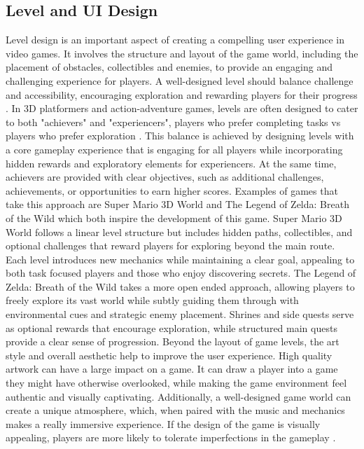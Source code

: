 \documentclass[10pt]{final_report}
\begin{document}
\subsection{Level and UI Design}\label{level}
Level design is an important aspect of creating a compelling user experience in video games. It involves the structure and layout of the game world, including the placement of obstacles, collectibles and enemies, to provide an engaging and challenging experience for players. A well-designed level should balance challenge and accessibility, encouraging exploration and rewarding players for their progress \cite{Kramarzewski2023}. In 3D platformers and action-adventure games, levels are often designed to cater to both "achievers" and "experiencers", players who prefer completing tasks vs players who prefer exploration \cite{zhao2022dynamic}. This balance is achieved by designing levels with a core gameplay experience that is engaging for all players while incorporating hidden rewards and exploratory elements for experiencers. At the same time, achievers are provided with clear objectives, such as additional challenges, achievements, or opportunities to earn higher scores. 
\newline
Examples of games that take this approach are Super Mario 3D World and The Legend of Zelda: Breath of the Wild which both inspire the development of this game. Super Mario 3D World follows a linear level structure but includes hidden paths, collectibles, and optional challenges that reward players for exploring beyond the main route. Each level introduces new mechanics while maintaining a clear goal, appealing to both task focused players and those who enjoy discovering secrets.
The Legend of Zelda: Breath of the Wild takes a more open ended approach, allowing players to freely explore its vast world while subtly guiding them through with environmental cues and strategic enemy placement. Shrines and side quests serve as optional rewards that encourage exploration, while structured main quests provide a clear sense of progression.
\newline
Beyond the layout of game levels, the art style and overall aesthetic help to improve the user experience. High quality artwork can have a large impact on a game. It can draw a player into a game they might have otherwise overlooked, while making the game environment feel authentic and visually captivating. Additionally, a well-designed game world can create a unique atmosphere, which, when paired with the music and mechanics makes a really immersive experience. If the design of the game is visually appealing, players are more likely to tolerate imperfections in the gameplay \cite{Jesse2019}. \newline
\end{document}
